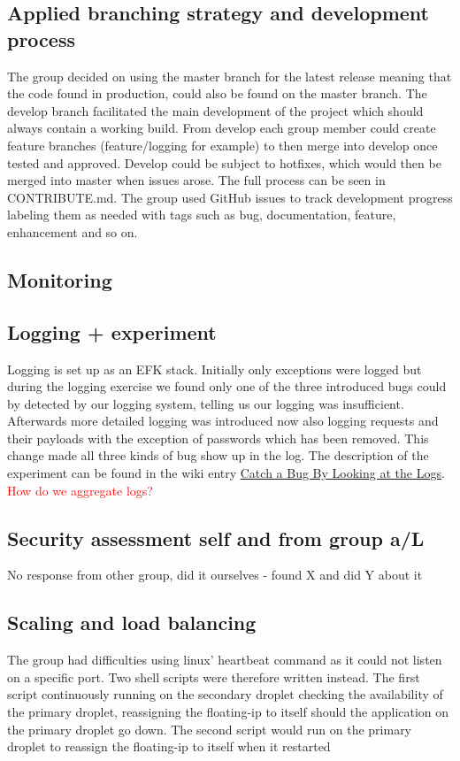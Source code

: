
\subsection{Applied branching strategy and development process} %
The group decided on using the master branch for the latest release meaning that the code found in production, could also be found on the master branch. The develop branch facilitated the main development of the project which should always contain a working build. From develop each group member could create feature branches (feature/logging for example) to then merge into develop once tested and approved. Develop could be subject to hotfixes, which would then be merged into master when issues arose. The full process can be seen in CONTRIBUTE.md. The group used GitHub issues to track development progress labeling them as needed with tags such as bug, documentation, feature, enhancement and so on.

\subsection{Monitoring} %

\subsection{Logging + experiment}
Logging is set up as an EFK stack. Initially only exceptions were logged but during the logging exercise we found only one of the three introduced bugs could by detected by our logging system, telling us our logging was insufficient. Afterwards more detailed logging was introduced now also logging requests and their payloads with the exception of passwords which has been removed. This change made all three kinds of bug show up in the log. The description of the experiment can be found in the wiki entry \underline{\href{https://github.com/DevOps2021-gb/devops2021/wiki/Catch-a-Bug-By-Looking-at-the-Logs}{Catch a Bug By Looking at the Logs}}.
\textcolor{red}{How do we aggregate logs?}

\subsection{Security assessment self and from group a/L} %
No response from other group, did it ourselves - found X and did Y about it

\subsection{Scaling and load balancing}\label{subsection:scaling} %
The group had difficulties using linux' heartbeat command as it could not listen on a specific port. Two shell scripts were therefore written instead. The first script continuously running on the secondary droplet checking the availability of the primary droplet, reassigning the floating-ip to itself should the application on the primary droplet go down. The second script would run on the primary droplet to reassign the floating-ip to itself when it restarted 